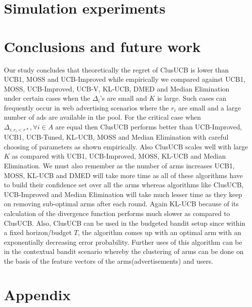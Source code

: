 \documentclass[twoside]{article}
\begin{document}
\section{Simulation experiments}
\label{sec:expts}



\section{Conclusions and future work}

Our study concludes that theoretically the regret of ClusUCB is lower than UCB1, MOSS and UCB-Improved while empirically we compared against UCB1, MOSS, UCB-Improved, UCB-V, KL-UCB, DMED and Median Elimination under certain cases when the $\Delta_{i}$'s are small and $K$ is large. Such cases can frequently occur in web advertising scenarios where the $r_{i}$ are small and a large number of ads are available in the pool. For the critical case when $\Delta_{i:r_{i}<r*}, \forall i\in A$ are equal then ClusUCB performs better than UCB-Improved, UCB1, UCB-Tuned, KL-UCB, MOSS and Median Elimination with careful choosing  of parameters as shown empirically. Also ClusUCB scales well with large $K$ as compared with UCB1, UCB-Improved, MOSS, KL-UCB and Median Elimination. We must also remember as the number of arms increases UCB1, MOSS, KL-UCB and DMED will take more time as all of these algorithms have to build their confidence set over all the arms whereas algorithms like ClusUCB, UCB-Improved and Median Elimination will take much lesser time as they keep on removing sub-optimal arms after each round. Again KL-UCB because of its calculation of the divergence function performs much slower as compared to ClusUCB. Also, ClusUCB can be used in the budgeted bandit setup since within a fixed horizon/budget $T$, the algorithm comes up with an optimal arm with an exponentially decreasing error probability. Further uses of this algorithm can be in the contextual bandit scenario whereby the clustering of arms can be done on the basis of the feature vectors of the arms(advertisements) and users.







\clearpage
\newpage
\onecolumn
\section*{Appendix}


\end{document}
